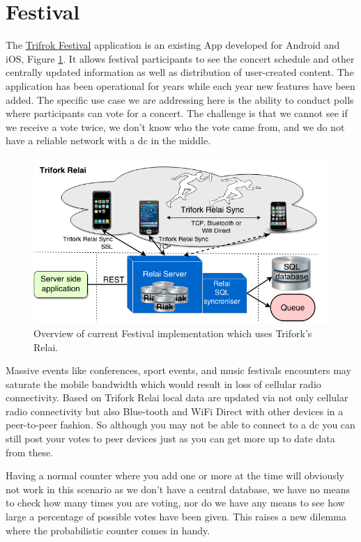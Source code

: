 \section{Festival}
The \href{https://www.trifork.com/news/roskilde-festival}{Trifrok Festival} application is an existing App developed for Android and iOS, Figure \ref{fig:relai_layout}. It allows festival participants to see the concert schedule and other centrally updated information as well as distribution of user-created content. The application has been operational for years while each year new features have been added. The specific use case we are addressing here is the ability to conduct polls where participants can vote for a concert. The challenge is that we cannot see if we receive a vote twice, we don't know who the vote came from, and we do not have a reliable network with a \gls{dc} in the middle.
\begin{figure}[!ht]
	\centering
	\includegraphics[width=1\textwidth]{figures/TriforkRelai.png}
	
	\caption{Overview of current Festival implementation which uses Trifork's Relai.}
	\label{fig:relai_layout}
\end{figure}

Massive events like conferences, sport events, and music festivals encounters may saturate the mobile bandwidth which would result in loss of cellular radio connectivity. Based on Trifork Relai local data are updated via not only cellular radio connectivity but also Blue-tooth and WiFi Direct with other devices in a peer-to-peer fashion. So although you may not be able to connect to a \gls{dc} you can still post your votes to peer devices just as you can get more up to date data from these.

Having a normal counter where you add one or more at the time will obviously not work in this scenario as we don't have a central database, we have no means to check how many times you are voting, nor do we have any means to see how large a percentage of possible votes have been given. This raises a new dilemma where the probabilistic counter comes in handy.

